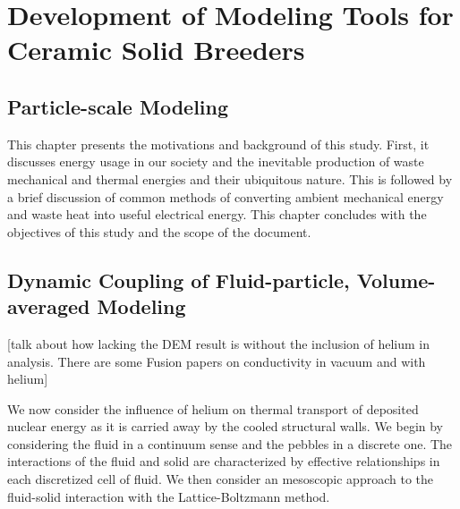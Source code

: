 \chapter{Development of Modeling Tools for Ceramic Solid Breeders}

\section{Particle-scale Modeling} \label{sec:modeling-dem}
This chapter presents the motivations and background of this study. First, it discusses energy usage in our society and the inevitable production of waste mechanical and thermal energies and their ubiquitous nature. This is followed by a brief discussion of common methods of converting ambient mechanical energy and waste heat into useful electrical energy. This chapter concludes with the objectives of this study and the scope of the document.















\section{Dynamic Coupling of Fluid-particle, Volume-averaged Modeling} \label{sec:modeling-cfd-dem}
[talk about how lacking the DEM result is without the inclusion of helium in analysis. There are some Fusion papers on conductivity in vacuum and with helium]

We now consider the influence of helium on thermal transport of deposited nuclear energy as it is carried away by the cooled structural walls. We begin by considering the fluid in a continuum sense and the pebbles in a discrete one. The interactions of the fluid and solid are characterized by effective relationships in each discretized cell of fluid. We then consider an mesoscopic approach to the fluid-solid interaction with the Lattice-Boltzmann method. 

